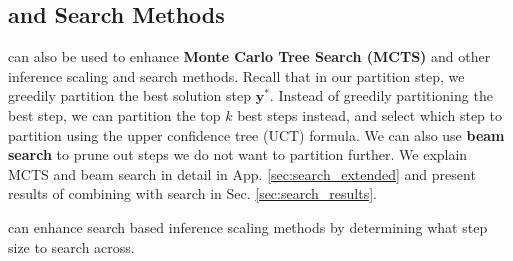 
















\subsection{\decomp and Search Methods}
\decomp can also be used to enhance \textbf{Monte Carlo Tree Search (MCTS)} and other inference scaling and search methods. Recall that in our partition step, we greedily partition the best solution step $\boldsymbol{y}^*$. Instead of greedily partitioning the best step, we can partition the top $k$ best steps instead, and select which step to partition using the upper confidence tree (UCT) formula. We can also use \textbf{beam search} to prune out steps we do not want to partition further. 
We explain MCTS and beam search in detail in App. \ref{sec:search_extended} and present results of combining \decomp with search in Sec. \ref{sec:search_results}.




\vspace{-0.2cm}  
\begin{tcolorbox}[title=Takeaway: Dynamic step sizes can improve search,boxsep=0.5mm, colframe=low,]\footnotesize{
    \decomp can enhance search based inference scaling methods by determining what step size to search across.}
\end{tcolorbox}
\vspace{-0.3cm}  

\vspace{-0.1cm}  
